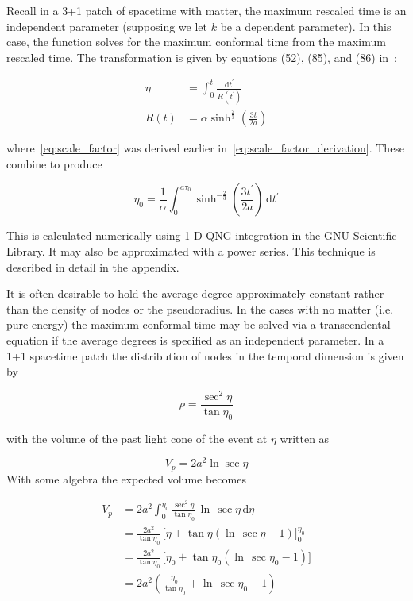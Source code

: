 \documentclass[preprint,notitlepage,amsmath,amssymb,floatfix]{revtex4-1}
\begin{document}
\noindent Recall in a 3+1 patch of spacetime with matter, the maximum rescaled time is an independent parameter (supposing we let $\bar{k}$ be a dependent parameter).
In this case, the function solves for the maximum conformal time from the maximum rescaled time.
The transformation is given by equations (52), (85), and (86) in~\cite{ref:snc2012}:

\begin{align}
\eta &= \int_0^t\!\frac{\mathrm dt^\prime}{R\left(t^\prime\right)} \label{eq:t_to_eta} \\
R\left(t\right) &= \alpha\sinh^{\frac{2}{3}}\left(\frac{3t}{2a}\right) \label{eq:scale_factor}
\end{align}

\noindent where~\eqref{eq:scale_factor} was derived earlier in~\eqref{eq:scale_factor_derivation}.
These combine to produce

\begin{equation}
\eta_0 = \frac{1}{\alpha}\int_0^{a\tau_0}\!\sinh^{-\frac{2}{3}}\left(\frac{3t^\prime}{2a}\right)\,\mathrm dt^\prime
\end{equation}

\noindent This is calculated numerically using 1-D QNG integration in the GNU Scientific Library.  It may also be approximated with a power series.  This technique is described in detail in the appendix. \par
It is often desirable to hold the average degree approximately constant rather than the density of nodes or the pseudoradius.  
In the cases with no matter (i.e. pure energy) the maximum conformal time may be solved via a transcendental equation if the average degrees is specified as an independent parameter.
In a 1+1 spacetime patch the distribution of nodes in the temporal dimension is given by

\begin{equation}
\rho = \frac{\sec^2\eta}{\tan\eta_0}
\end{equation}

\noindent with the volume of the past light cone of the event at $\eta$ written as

\begin{equation}
V_p = 2a^2\ln\sec\eta
\end{equation}
\noindent With some algebra the expected volume becomes

\begin{equation}
\begin{split}
V_p &= 2a^2\int_0^{\eta_0}\!\frac{\sec^2\eta}{\tan\eta_0}\,\ln\,\sec\eta\,\mathrm{d}\eta \\
  &= \frac{2a^2}{\tan\eta_0}\,\lbrack\eta + \tan\eta\left(\ln\,\sec\eta - 1\right)\rbrack_0^{\eta_0} \\
  &= \frac{2a^2}{\tan\eta_0}\,\lbrack\eta_0 + \tan\eta_0\left(\ln\,\sec\eta_0 - 1\right)\rbrack \\
  &= 2a^2\left(\frac{\eta_0}{\tan\eta_0} + \ln\,\sec\eta_0 - 1\right)
\end{split}
\end{equation}
\end{document}
